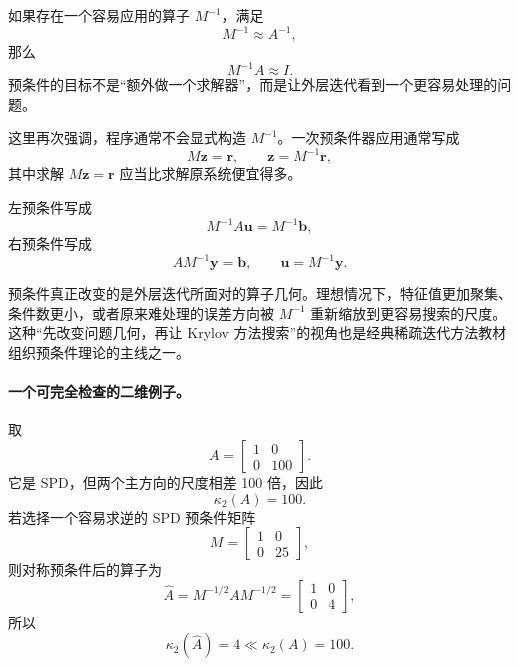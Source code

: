 如果存在一个容易应用的算子 $M^{-1}$，满足
\begin{equation}
M^{-1}\approx A^{-1},
\end{equation}
那么
\begin{equation}
M^{-1}A\approx I.
\end{equation}
预条件的目标不是“额外做一个求解器”，而是让外层迭代看到一个更容易处理的问题。

这里再次强调，程序通常不会显式构造 $M^{-1}$。一次预条件器应用通常写成
\begin{equation}
M\bm z=\bm r,
\qquad
\bm z=M^{-1}\bm r,
\label{eq:preconditioning-apply}
\end{equation}
其中求解 $M\bm z=\bm r$ 应当比求解原系统便宜得多。

左预条件写成
\begin{equation}
M^{-1}A\bm u
=
M^{-1}\bm b,
\label{eq:preconditioning-left}
\end{equation}
右预条件写成
\begin{equation}
AM^{-1}\bm y
=
\bm b,
\qquad
\bm u=M^{-1}\bm y.
\label{eq:preconditioning-right}
\end{equation}

预条件真正改变的是外层迭代所面对的算子几何。理想情况下，特征值更加聚集、条件数更小，或者原来难处理的误差方向被 $M^{-1}$ 重新缩放到更容易搜索的尺度。这种“先改变问题几何，再让 Krylov 方法搜索”的视角也是经典稀疏迭代方法教材组织预条件理论的主线之一\cite{saad2003}。

\paragraph{一个可完全检查的二维例子。}
取
\begin{equation}
A=
\begin{bmatrix}
1&0\\
0&100
\end{bmatrix}.
\end{equation}
它是 SPD，但两个主方向的尺度相差 100 倍，因此
\begin{equation}
\kappa_2(A)=100.
\end{equation}
若选择一个容易求逆的 SPD 预条件矩阵
\begin{equation}
M=
\begin{bmatrix}
1&0\\
0&25
\end{bmatrix},
\end{equation}
则对称预条件后的算子为
\begin{equation}
\widehat A
=
M^{-1/2}AM^{-1/2}
=
\begin{bmatrix}
1&0\\
0&4
\end{bmatrix},
\end{equation}
所以
\begin{equation}
\boxed{
\kappa_2(\widehat A)=4
\ll
\kappa_2(A)=100.
}
\label{eq:preconditioning-two-dimensional-example}
\end{equation}


